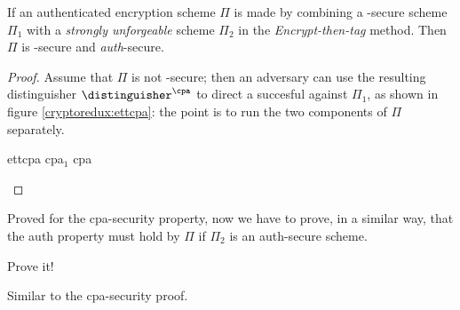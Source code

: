 \begin{theorem}
    If an authenticated encryption scheme $\Pi$ is made by combining a \cpa-secure \ske{} scheme $\Pi_1$ with a \emph{strongly unforgeable} \mac{} scheme $\Pi_2$ in the \emph{Encrypt-then-tag} method. Then $\Pi$ is \cpa-secure and \textit{auth}-secure. 
\end{theorem}

\begin{proof}

    Assume that $\Pi$ is not \cpa-secure; then an adversary can use the resulting distinguisher $\distinguisher^{\cpa}$ to direct a succesful \cpa{} against $\Pi_1$, as shown in figure \ref{cryptoredux:ettcpa}: the point is to run the two components of $\Pi$ separately.

    \begin{cryptoredux}
        {ettcpa}
        {}
        {cpa$_1$}
        {cpa}


        \cseqbeginloop
        \cseqendloop

        \cseqdelay
        

        \cseqdelay

        \cseqbeginloop
        \cseqendloop

        \cseqdelay


    \end{cryptoredux}


\end{proof}

Proved for the cpa-security property, now we have to prove, in a similar way, that the auth property must hold by $\Pi$ if $\Pi_2$ is an auth-secure scheme.
\begin{exercise}
    Prove it!

    Similar to the cpa-security proof.
\end{exercise}

